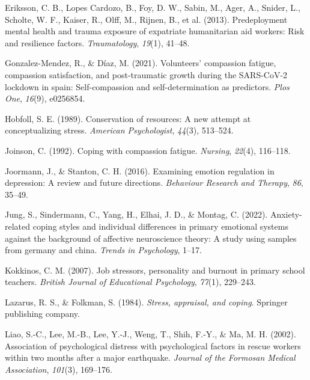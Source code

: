 \documentclass[
  man,floatsintext]{apa7}
\newlength{\cslhangindent}
\newlength{\cslentryspacingunit} %
\newenvironment{CSLReferences}[2] %
 {%
  \setlength{\parindent}{0pt}
  \ifodd #1
  \let\oldpar\par
  \def\par{\hangindent=\cslhangindent\oldpar}
  \fi
  \setlength{\parskip}{#2\cslentryspacingunit}
 }%
 {}
\begin{document}
\begin{CSLReferences}{1}{0}
\leavevmode{}%
Eriksson, C. B., Lopes Cardozo, B., Foy, D. W., Sabin, M., Ager, A., Snider, L., Scholte, W. F., Kaiser, R., Olff, M., Rijnen, B., et al. (2013). Predeployment mental health and trauma exposure of expatriate humanitarian aid workers: Risk and resilience factors. \emph{Traumatology}, \emph{19}(1), 41--48.

\leavevmode{}%
Gonzalez-Mendez, R., \& Díaz, M. (2021). Volunteers' compassion fatigue, compassion satisfaction, and post-traumatic growth during the SARS-CoV-2 lockdown in spain: Self-compassion and self-determination as predictors. \emph{Plos One}, \emph{16}(9), e0256854.

\leavevmode{}%
Hobfoll, S. E. (1989). Conservation of resources: A new attempt at conceptualizing stress. \emph{American Psychologist}, \emph{44}(3), 513--524.

\leavevmode{}%
Joinson, C. (1992). Coping with compassion fatigue. \emph{Nursing}, \emph{22}(4), 116--118.

\leavevmode{}%
Joormann, J., \& Stanton, C. H. (2016). Examining emotion regulation in depression: A review and future directions. \emph{Behaviour Research and Therapy}, \emph{86}, 35--49.

\leavevmode{}%
Jung, S., Sindermann, C., Yang, H., Elhai, J. D., \& Montag, C. (2022). Anxiety-related coping styles and individual differences in primary emotional systems against the background of affective neuroscience theory: A study using samples from germany and china. \emph{Trends in Psychology}, 1--17.

\leavevmode{}%
Kokkinos, C. M. (2007). Job stressors, personality and burnout in primary school teachers. \emph{British Journal of Educational Psychology}, \emph{77}(1), 229--243.

\leavevmode{}%
Lazarus, R. S., \& Folkman, S. (1984). \emph{Stress, appraisal, and coping}. Springer publishing company.

\leavevmode{}%
Liao, S.-C., Lee, M.-B., Lee, Y.-J., Weng, T., Shih, F.-Y., \& Ma, M. H. (2002). Association of psychological distress with psychological factors in rescue workers within two months after a major earthquake. \emph{Journal of the Formosan Medical Association}, \emph{101}(3), 169--176.


\end{CSLReferences}
\end{document}

